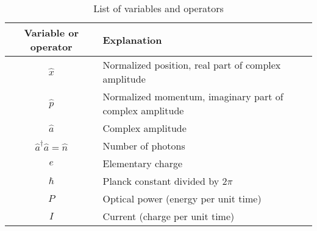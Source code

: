 \begin{table}
\caption{List of variables and operators}	
\begin{center}
\begin{tabular}{c l}
\hline
	Variable or operator & Explanation \\
	\hline \hline
	$\hat x$ & Normalized position, real part of complex amplitude\\
	$\hat p$ & Normalized momentum, imaginary part of complex amplitude\\
	$\hat a$ & Complex amplitude\\
	$\hat a ^\dagger \hat a = \hat n$ & Number of photons\\
	$e$ & Elementary charge\\
	$\hbar$ & Planck constant divided by $2\pi$\\
	$P$ & Optical power (energy per unit time)\\
	$I$ & Current (charge per unit time)\\
\hline
\end{tabular}
\label{table:variables}
\end{center}
\end{table}

